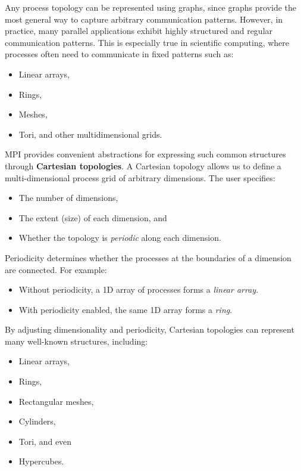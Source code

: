 \documentclass[12pt]{book}
\begin{document}
Any process topology can be represented using graphs, since graphs provide the most general way to capture arbitrary communication patterns.  
However, in practice, many parallel applications exhibit highly structured and regular communication patterns. This is especially true in scientific computing, where processes often need to communicate in fixed patterns such as:
\begin{itemize}
    \item Linear arrays,
    \item Rings,
    \item Meshes,
    \item Tori, and other multidimensional grids.
\end{itemize}

MPI provides convenient abstractions for expressing such common structures through \textbf{Cartesian topologies}.  
A Cartesian topology allows us to define a multi-dimensional process grid of arbitrary dimensions. The user specifies:
\begin{itemize}
    \item The number of dimensions,
    \item The extent (size) of each dimension, and
    \item Whether the topology is \emph{periodic} along each dimension.
\end{itemize}

Periodicity determines whether the processes at the boundaries of a dimension are connected. For example:
\begin{itemize}
    \item Without periodicity, a 1D array of processes forms a \emph{linear array}.
    \item With periodicity enabled, the same 1D array forms a \emph{ring}.
\end{itemize}

By adjusting dimensionality and periodicity, Cartesian topologies can represent many well-known structures, including:
\begin{itemize}
    \item Linear arrays,
    \item Rings,
    \item Rectangular meshes,
    \item Cylinders,
    \item Tori, and even
    \item Hypercubes.
\end{itemize}
\end{document}
